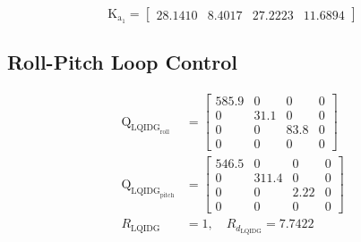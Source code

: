 \documentclass[conference]{IEEEtran}
\begin{document}
\begin{equation}
	\boldsymbol{\mathrm{K_{a_1}}} = \begin{bmatrix}
		28.1410 &   8.4017  & 27.2223  & 11.6894
	\end{bmatrix}
\end{equation}
\subsection{Roll-Pitch Loop Control}
\begin{equation}
	\begin{split}
		\boldsymbol{\mathrm{Q}}_{{\text{LQIDG}_{\text{roll}}}} &= \begin{bmatrix}
			585.9 &0& 0& 0\\
			0 &  31.1 & 0 &0 \\
			0 & 0 & 83.8 & 0\\
			0 & 0 & 0 & 0
		\end{bmatrix}\\[1em]
	    \boldsymbol{\mathrm{Q}}_{{\text{LQIDG}_{\text{pitch}}}} &= \begin{bmatrix}
		546.5 &0& 0& 0\\
		0 &  311.4 & 0 &0 \\
		0 & 0 & 2.22 & 0\\
		0 & 0 & 0 & 0
		\end{bmatrix}\\[1em]
	 R_{{\text{LQIDG}}} &=  1, \quad R_{d_{\text{LQIDG}}} =  7.7422
	\end{split}
\end{equation}
\end{document}
